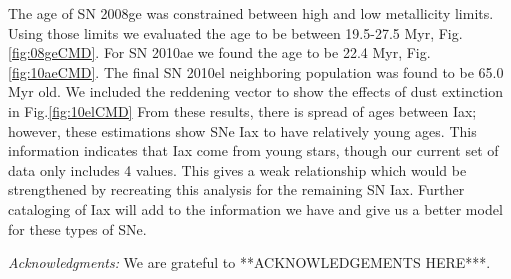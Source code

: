 \documentclass[preprint]{aastex}
\begin{document}
The age of SN 2008ge was constrained between high and low metallicity limits. 
Using those limits we evaluated the age to be between 19.5-27.5 Myr, Fig.\ref{fig:08geCMD}.
For SN 2010ae we found the age to be 22.4 Myr, Fig.\ref{fig:10aeCMD}. 
The final SN 2010el neighboring population was found to be 65.0 Myr old. 
We included the reddening vector to show the effects of dust extinction in Fig.\ref{fig:10elCMD}
From these results, there is spread of ages between Iax;
however, these estimations show SNe Iax to have relatively young ages. 
This information indicates that Iax come from young stars, though
our current set of data only includes 4 values. 
This gives a weak relationship which would be strengthened by recreating this analysis for the remaining SN Iax.
Further cataloging of Iax will add to the information we have and give us a better model for these types of SNe.
  

{\it Acknowledgments:} We are grateful to **ACKNOWLEDGEMENTS HERE***.
\FloatBarrier
{}

\end{document}
